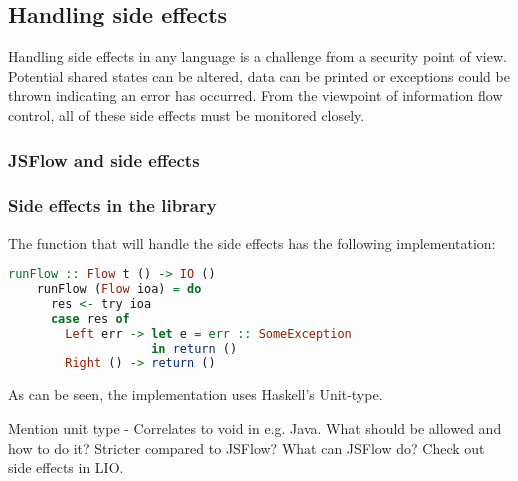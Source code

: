 \subsection{Handling side effects}
Handling side effects in any language is a challenge from a security point of view. Potential shared states can be altered, data can be printed or exceptions could be thrown indicating an error has occurred. From the viewpoint of information flow control, all of these side effects must be monitored closely.

\subsubsection{JSFlow and side effects}

\subsubsection{Side effects in the library}
The function that will handle the side effects has the following implementation:
\begin{center}
  \begin{lstlisting}[language=Haskell]
    runFlow :: Flow t () -> IO ()
    runFlow (Flow ioa) = do
      res <- try ioa
      case res of
        Left err -> let e = err :: SomeException
                    in return ()
        Right () -> return ()
  \end{lstlisting}
\end{center}
As can be seen, the implementation uses Haskell's Unit-type.

Mention unit type - Correlates to void in e.g. Java.
What should be allowed and how to do it?
Stricter compared to JSFlow?
What can JSFlow do?
Check out side effects in LIO.


